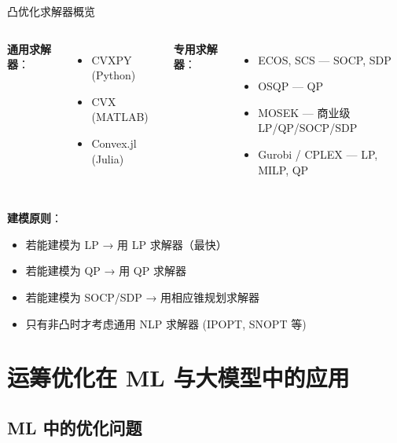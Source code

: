\documentclass[11pt, aspectratio=169, svgnames, table, fontset=fandol]{ctexbeamer}
\begin{document}
\begin{frame}{凸优化求解器概览}
  \begin{columns}[T]
    \textbf{通用求解器}：
    \begin{itemize}
      \item CVXPY (Python)
      \item CVX (MATLAB)
      \item Convex.jl (Julia)
    \end{itemize}
    \textbf{专用求解器}：
    \begin{itemize}
      \item ECOS, SCS — SOCP, SDP
      \item OSQP — QP
      \item MOSEK — 商业级 LP/QP/SOCP/SDP
      \item Gurobi / CPLEX — LP, MILP, QP
    \end{itemize}
  \end{columns}

  \vspace{8pt}
  \textbf{建模原则}：
  \begin{itemize}
    \item 若能建模为 LP → 用 LP 求解器（最快）
    \item 若能建模为 QP → 用 QP 求解器
    \item 若能建模为 SOCP/SDP → 用相应锥规划求解器
    \item 只有非凸时才考虑通用 NLP 求解器 (IPOPT, SNOPT 等)
  \end{itemize}
\end{frame}

\section{运筹优化在 ML 与大模型中的应用}

\subsection{ML 中的优化问题}
\end{document}
